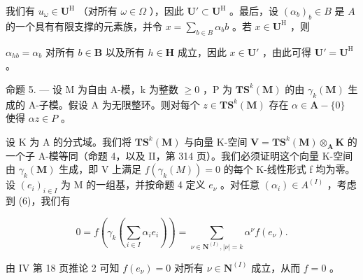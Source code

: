 我们有 \(u_{\omega} \in \mathbf{U}^{\mathrm{H}}\) （对所有 \(\omega \in \Omega\) ），因此 \(\mathbf{U}' \subset \mathbf{U}^{\mathrm{H}}\) 。最后，设 \((\alpha_b)_b \in B\) 是 \(A\) 的一个具有有限支撑的元素族，并令 \(x = \sum_{b \in B} \alpha_b b\) 。若 \(x \in \mathbf{U}^{\mathrm{H}}\) ，则

\(\alpha_{hb} = \alpha_b\) 对所有 \(b \in \mathbf{B}\) 以及所有 \(h \in \mathbf{H}\) 成立，因此 \(x \in \mathbf{U}'\) ，由此可得 \(\mathbf{U}' = \mathbf{U}^{\mathrm{H}}\) 。

命题 5. --- 设 M 为自由 A-模，k 为整数 \(\geqslant0\) ，P 为 \(\mathbf{TS}^{k}(\mathbf{M})\) 的由 \(\gamma_{k}(\mathbf{M})\) 生成的 A-子模。假设 A 为无限整环。则对每个 \(z\in\mathbf{TS}^{k}(\mathbf{M})\) 存在 \(\alpha\in\mathbf{A}-\{0\}\) 使得 \(\alpha z\in P\) 。

设 K 为 A 的分式域。我们将 \(\mathbf{T}\mathbf{S}^{k}(\mathbf{M})\) 与向量 K-空间 \(\mathbf{V} = \mathbf{T}\mathbf{S}^{k}(\mathbf{M}) \otimes_{\mathbf{A}} \mathbf{K}\) 的一个子 A-模等同（命题 4，以及 II，第 314 页）。我们必须证明这个向量 K-空间由 \(\gamma_{k}(\mathbf{M})\) 生成，即 V 上满足 \(f(\gamma_k(M)) = 0\) 的每个 K-线性形式 f 均为零。设 \((e_i)_{i \in I}\) 为 M 的一组基，并按命题 4 定义 \(e_\nu\) 。对任意 \((\alpha_i) \in A^{(I)}\) ，考虑到 (6)，我们有

\[
0 = f \left(\gamma_ {k} \left(\sum_ {i \in I} \alpha_ {i} e _ {i}\right)\right) = \sum_ {\nu \in \mathbf {N} ^ {(I)}, | \nu | = k} \alpha^ {\nu} f (e _ {\nu}).
\]

由 IV 第 18 页推论 2 可知 \(f(e_{\nu}) = 0\) 对所有 \(\nu \in \mathbf{N}^{(I)}\) 成立，从而 \(f = 0\) 。

